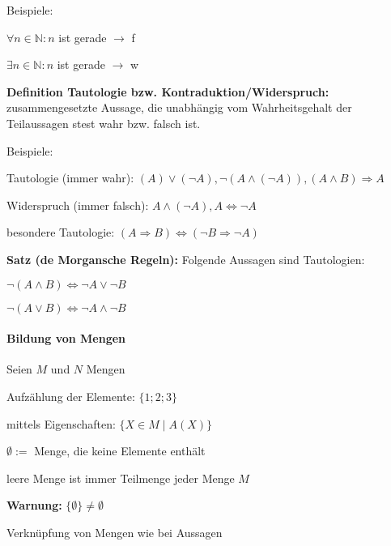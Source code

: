 Beispiele:
\begin{compactitem}
	\item $\forall n \in \mathbb{N}: n$ ist gerade $\to$ f
	\item $\exists n \in \mathbb{N}: n$ ist gerade $\to$ w 
\end{compactitem}

\begin{framed}
	\textbf{Definition Tautologie bzw. Kontraduktion/Widerspruch:} zusammengesetzte Aussage, die 
	unabh\"angig vom Wahrheitsgehalt der Teilaussagen stest wahr bzw. falsch ist.
\end{framed}

Beispiele:
\begin{compactitem}
	\item Tautologie (immer wahr): 
	$(A) \lor (\lnot A), \lnot (A  \land (\lnot A)), (A \land B) \Rightarrow A$
	\item Widerspruch (immer falsch): $A \land (\lnot A), A \iff \lnot A$  
	\item besondere Tautologie: $(A \Rightarrow B) \iff (\lnot B \Rightarrow \lnot A)$
\end{compactitem}

\begin{framed}
	\textbf{Satz (de Morgansche Regeln):} Folgende Aussagen sind Tautologien:
	\begin{compactitem}
		\item $\lnot(A \land B) \iff \lnot A \lor \lnot B$ 
		\item $\lnot(A \lor B) \iff \lnot A \land \lnot B$ 
	\end{compactitem}
\end{framed}

\paragraph{Bildung von Mengen}
Seien $M$ und $N$ Mengen
\begin{compactitem}
	\item Aufz\"ahlung der Elemente: $\{1;2;3\}$
	\item mittels Eigenschaften: $\{X \in M \mid A(X)\}$
	\item $\emptyset:=$ Menge, die keine Elemente enth\"alt
	\begin{compactitem}
		\item leere Menge ist immer Teilmenge jeder Menge $M$
		\item \textbf{Warnung:} $\{\emptyset\} \neq \emptyset$
	\end{compactitem}
	\item Verkn\"upfung von Mengen wie bei Aussagen
\end{compactitem}


